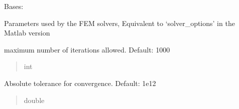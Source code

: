 \documentclass[letterpaper,10pt,english]{sphinxmanual}
\begin{document}
\begin{fulllineitems}
\label{\detokenize{_autosummary/nirfasterff.utils.SolverOptions:nirfasterff.utils.SolverOptions}}
\pysigstartsignatures
{}
\pysigstopsignatures
\sphinxAtStartPar
Bases: 

\sphinxAtStartPar
Parameters used by the FEM solvers, Equivalent to ‘solver\_options’ in the Matlab version

\begin{fulllineitems}
\label{\detokenize{_autosummary/nirfasterff.utils.SolverOptions:nirfasterff.utils.SolverOptions.max_iter}}
\pysigstartsignatures
{}
\pysigstopsignatures
\sphinxAtStartPar
maximum number of iterations allowed. Default: 1000
\begin{quote}\begin{description}
\sphinxAtStartPar
int

\end{description}\end{quote}

\end{fulllineitems}


\begin{fulllineitems}
\label{\detokenize{_autosummary/nirfasterff.utils.SolverOptions:nirfasterff.utils.SolverOptions.AbsoluteTolerance}}
\pysigstartsignatures
{}
\pysigstopsignatures
\sphinxAtStartPar
Absolute tolerance for convergence. Default: 1e\sphinxhyphen{}12
\begin{quote}\begin{description}
\sphinxAtStartPar
double


\end{description}
\end{quote}
\end{fulllineitems}
\end{fulllineitems}
\end{document}
